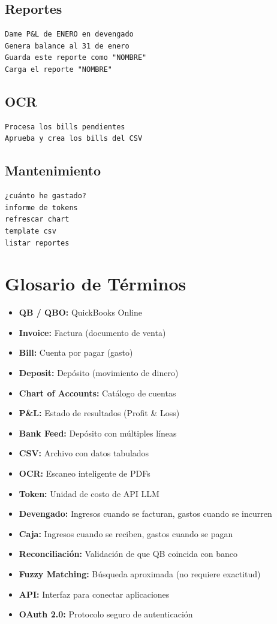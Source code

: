 \documentclass[12pt,oneside]{article}
\begin{document}
\subsection{Reportes}
\begin{verbatim}
Dame P&L de ENERO en devengado
Genera balance al 31 de enero
Guarda este reporte como "NOMBRE"
Carga el reporte "NOMBRE"
\end{verbatim}

\subsection{OCR}
\begin{verbatim}
Procesa los bills pendientes
Aprueba y crea los bills del CSV
\end{verbatim}

\subsection{Mantenimiento}
\begin{verbatim}
¿cuánto he gastado?
informe de tokens
refrescar chart
template csv
listar reportes
\end{verbatim}

\section{Glosario de Términos}

\begin{itemize}
    \item \textbf{QB / QBO:} QuickBooks Online
    \item \textbf{Invoice:} Factura (documento de venta)
    \item \textbf{Bill:} Cuenta por pagar (gasto)
    \item \textbf{Deposit:} Depósito (movimiento de dinero)
    \item \textbf{Chart of Accounts:} Catálogo de cuentas
    \item \textbf{P\&L:} Estado de resultados (Profit \& Loss)
    \item \textbf{Bank Feed:} Depósito con múltiples líneas
    \item \textbf{CSV:} Archivo con datos tabulados
    \item \textbf{OCR:} Escaneo inteligente de PDFs
    \item \textbf{Token:} Unidad de costo de API LLM
    \item \textbf{Devengado:} Ingresos cuando se facturan, gastos cuando se incurren
    \item \textbf{Caja:} Ingresos cuando se reciben, gastos cuando se pagan
    \item \textbf{Reconciliación:} Validación de que QB coincida con banco
    \item \textbf{Fuzzy Matching:} Búsqueda aproximada (no requiere exactitud)
    \item \textbf{API:} Interfaz para conectar aplicaciones
    \item \textbf{OAuth 2.0:} Protocolo seguro de autenticación
\end{itemize}
\end{document}
